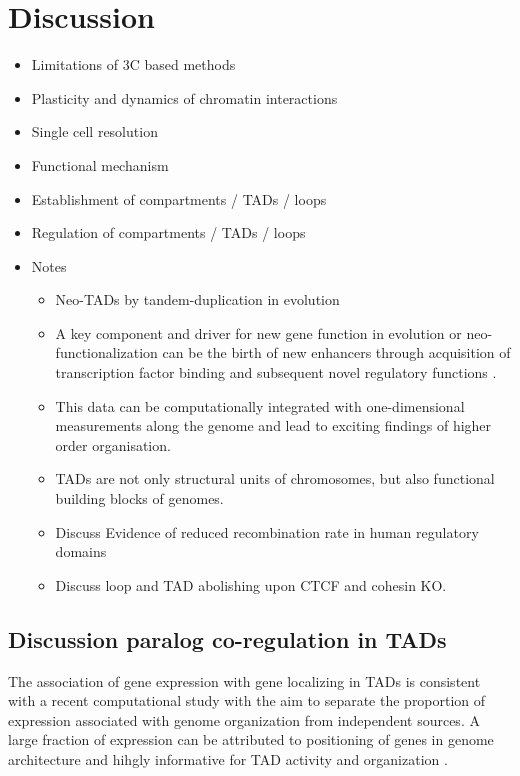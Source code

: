 \documentclass[a4paper,twoside=true,openright,parskip=full,chapterprefix=true,11pt,headings=normal,bibliography=totoc,listof=totoc,titlepage=on,captions=tableabove,draft=false]{scrreprt}
\providecommand{\tightlist}{%
  \setlength{\itemsep}{0pt}\setlength{\parskip}{0pt}}
\theoremstyle{definition}
\theoremstyle{definition}
\theoremstyle{definition}
\theoremstyle{remark}
\begin{document}
\hypertarget{thesis-discussion}{%
\chapter{Discussion}\label{thesis-discussion}}

\begin{itemize}
\item
  Limitations of 3C based methods
\item
  Plasticity and dynamics of chromatin interactions
\item
  Single cell resolution
\item
  Functional mechanism
\item
  Establishment of compartments / TADs / loops
\item
  Regulation of compartments / TADs / loops
\item
  Notes

  \begin{itemize}
  \tightlist
  \item
    Neo-TADs by tandem-duplication in evolution \citep{Franke2016}
  \item
    A key component and driver for new gene function in evolution or
    neo-functionalization can be the birth of new enhancers through
    acquisition of transcription factor binding and subsequent novel
    regulatory functions \citep{Long2016}.
  \item
    This data can be computationally integrated with one-dimensional
    measurements along the genome and lead to exciting findings of
    higher order organisation.
  \item
    TADs are not only structural units of chromosomes, but also
    functional building blocks of genomes.
  \item
    Discuss \citep{Liu2016b} Evidence of reduced recombination rate in
    human regulatory domains
  \item
    Discuss loop and TAD abolishing upon CTCF and cohesin KO.
  \end{itemize}
\end{itemize}

\hypertarget{discussion-paralog-co-regulation-in-tads}{%
\section{Discussion paralog co-regulation in
TADs}\label{discussion-paralog-co-regulation-in-tads}}

The association of gene expression with gene localizing in TADs is
consistent with a recent computational study with the aim to separate
the proportion of expression associated with genome organization from
independent sources. A large fraction of expression can be attributed to
positioning of genes in genome architecture and hihgly informative for
TAD activity and organization \citep{Rennie2018}.
\end{document}

